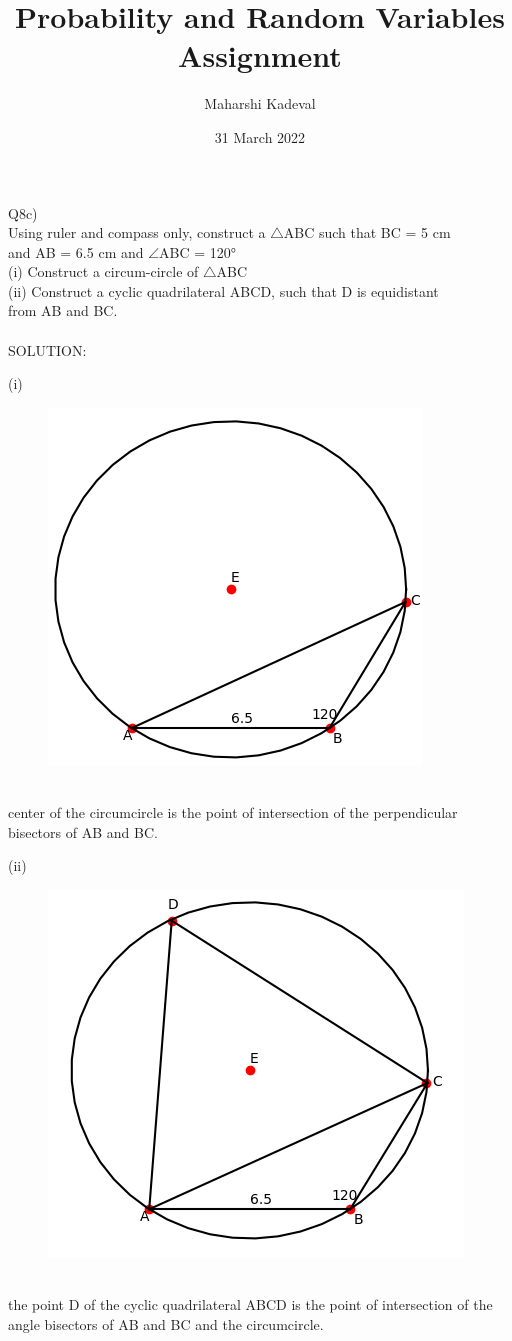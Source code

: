 \documentclass[12pt]{article}
\title{Probability and Random Variables Assignment}
\author{Maharshi Kadeval}
\date{31 March 2022}
\begin{document}
\maketitle

Q8c)\\
Using ruler and compass only, construct a $\bigtriangleup$ABC such that BC = 5 cm\\
and AB = 6.5 cm and $\angle$ABC = 120°\\
(i) Construct a circum-circle of $\bigtriangleup$ABC\\
(ii) Construct a cyclic quadrilateral ABCD, such that D is equidistant\\
from AB and BC.\\\\
SOLUTION:

(i)
\begin{figure}[!h]
\begin{center}
\includegraphics[scale=0.58]{fig1.png}\\
\end{center}
\end{figure}
\\
center of the circumcircle is the point of intersection of the perpendicular bisectors of AB and BC.

\pagebreak
(ii)
\begin{figure}[!h]
\begin{center}
\includegraphics[scale=0.6]{fig2.png}\\
\end{center}
\end{figure}
\\
the point D of the cyclic quadrilateral ABCD is the point of intersection of the angle 
bisectors of AB and BC and the circumcircle.
\end{document}
